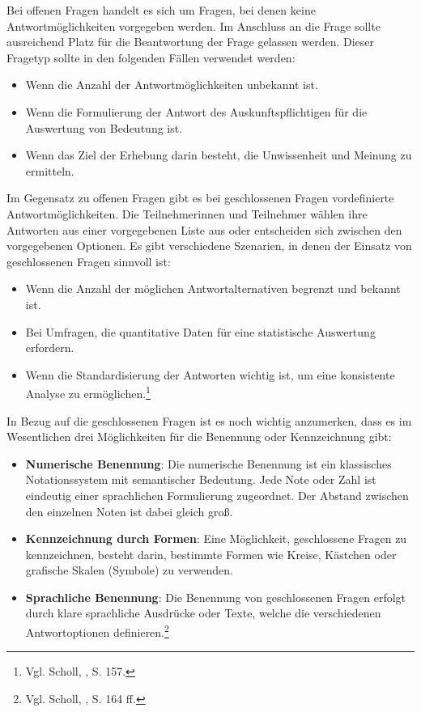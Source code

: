 Bei offenen Fragen handelt es sich um Fragen, bei denen keine Antwortmöglichkeiten vorgegeben werden. Im Anschluss an die
Frage sollte ausreichend Platz für die Beantwortung der Frage gelassen werden. Dieser Fragetyp sollte in den folgenden
Fällen verwendet werden:
\begin{itemize}
    \item Wenn die Anzahl der Antwortmöglichkeiten unbekannt ist.
    \item Wenn die Formulierung der Antwort des Auskunftspflichtigen für die Auswertung von Bedeutung ist.
    \item Wenn das Ziel der Erhebung darin besteht, die Unwissenheit und Meinung zu ermitteln.\\
\end{itemize}

Im Gegensatz zu offenen Fragen gibt es bei geschlossenen Fragen vordefinierte Antwortmöglichkeiten. Die Teilnehmerinnen
und Teilnehmer wählen ihre Antworten aus einer vorgegebenen Liste aus oder entscheiden sich zwischen den vorgegebenen
Optionen. Es gibt verschiedene Szenarien, in denen der Einsatz von geschlossenen Fragen sinnvoll ist:

\begin{itemize}
    \item Wenn die Anzahl der möglichen Antwortalternativen begrenzt und bekannt ist.
    \item Bei Umfragen, die quantitative Daten für eine statistische Auswertung erfordern.
    \item Wenn die Standardisierung der Antworten wichtig ist, um eine konsistente Analyse zu ermöglichen.\footnote{Vgl. Scholl, \cite{Die Befragung}, S. 157.}
\end{itemize}

In Bezug auf die geschlossenen Fragen ist es noch wichtig anzumerken, dass es im Wesentlichen drei Möglichkeiten für die
Benennung oder Kennzeichnung gibt:
\begin{itemize}
    \item \textbf{Numerische Benennung}: Die numerische Benennung ist ein klassisches Notationssystem mit semantischer Bedeutung. Jede Note oder Zahl ist
    eindeutig einer sprachlichen Formulierung zugeordnet. Der Abstand zwischen den einzelnen Noten ist dabei gleich groß.
    \item \textbf{Kennzeichnung durch Formen}: Eine Möglichkeit, geschlossene Fragen zu kennzeichnen, besteht darin, bestimmte Formen wie Kreise, Kästchen oder
    grafische Skalen (Symbole) zu verwenden.
    \item \textbf{Sprachliche Benennung}: Die Benennung von geschlossenen Fragen erfolgt durch klare sprachliche Ausdrücke oder Texte, welche die verschiedenen
    Antwortoptionen definieren.\footnote{Vgl. Scholl, \cite{Die Befragung}, S. 164 ff.}
\end{itemize}

